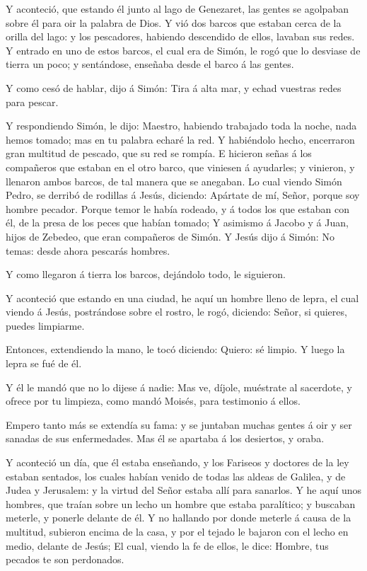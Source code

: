  Y aconteció, que estando él junto al lago de Genezaret, las
gentes se agolpaban sobre él para oir la palabra de Dios.  Y
vió dos barcos que estaban cerca de la orilla del lago: y los
pescadores, habiendo descendido de ellos, lavaban sus redes.
 Y entrado en uno de estos barcos, el cual era de Simón, le
rogó que lo desviase de tierra un poco; y sentándose, enseñaba desde el
barco á las gentes.

 Y como cesó de hablar, dijo á Simón: Tira á alta mar, y
echad vuestras redes para pescar.

 Y respondiendo Simón, le dijo: Maestro, habiendo trabajado
toda la noche, nada hemos tomado; mas en tu palabra echaré la red.
 Y habiéndolo hecho, encerraron gran multitud de pescado,
que su red se rompía.  E hicieron señas á los compañeros que
estaban en el otro barco, que viniesen á ayudarles; y vinieron, y
llenaron ambos barcos, de tal manera que se anegaban.  Lo
cual viendo Simón Pedro, se derribó de rodillas á Jesús, diciendo:
Apártate de mí, Señor, porque soy hombre pecador.  Porque
temor le había rodeado, y á todos los que estaban con él, de la presa de
los peces que habían tomado;  Y asimismo á Jacobo y á Juan,
hijos de Zebedeo, que eran compañeros de Simón. Y Jesús dijo á Simón: No
temas: desde ahora pescarás hombres.

 Y como llegaron á tierra los barcos, dejándolo todo, le
siguieron.

 Y aconteció que estando en una ciudad, he aquí un hombre
lleno de lepra, el cual viendo á Jesús, postrándose sobre el rostro, le
rogó, diciendo: Señor, si quieres, puedes limpiarme.

 Entonces, extendiendo la mano, le tocó diciendo: Quiero:
sé limpio. Y luego la lepra se fué de él.

 Y él le mandó que no lo dijese á nadie: Mas ve, díjole,
muéstrate al sacerdote, y ofrece por tu limpieza, como mandó Moisés,
para testimonio á ellos.

 Empero tanto más se extendía su fama: y se juntaban muchas
gentes á oir y ser sanadas de sus enfermedades.  Mas él se
apartaba á los desiertos, y oraba.

 Y aconteció un día, que él estaba enseñando, y los
Fariseos y doctores de la ley estaban sentados, los cuales habían venido
de todas las aldeas de Galilea, y de Judea y Jerusalem: y la virtud del
Señor estaba allí para sanarlos.  Y he aquí unos hombres,
que traían sobre un lecho un hombre que estaba paralítico; y buscaban
meterle, y ponerle delante de él.  Y no hallando por donde
meterle á causa de la multitud, subieron encima de la casa, y por el
tejado le bajaron con el lecho en medio, delante de Jesús; 
El cual, viendo la fe de ellos, le dice: Hombre, tus pecados te son
perdonados.

